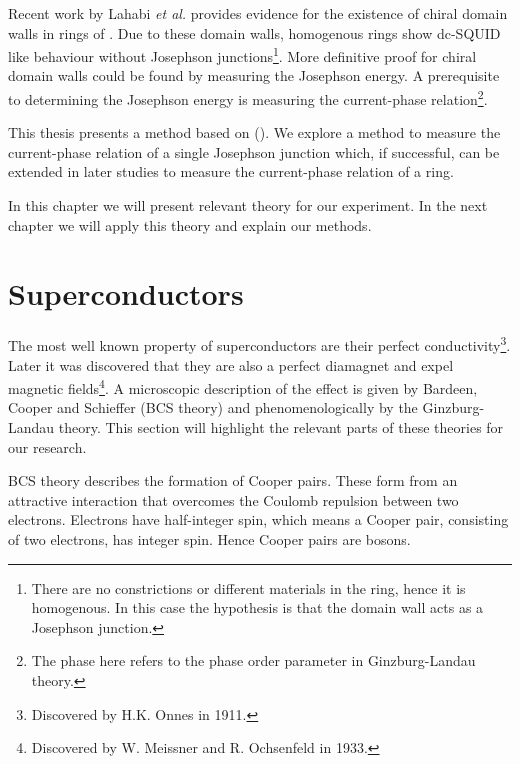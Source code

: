 Recent work by Lahabi \textit{et al.} provides evidence for the existence of chiral domain walls in rings of \cite{lahabiSpintripletSupercurrentsOdd2018}. Due to these domain walls, homogenous  rings show dc-SQUID like behaviour without Josephson junctions\footnote{There are no constrictions or different materials in the ring, hence it is homogenous. In this case the hypothesis is that the domain wall acts as a Josephson junction.}. More definitive proof for chiral domain walls could be found by measuring the Josephson energy. A prerequisite to determining the Josephson energy is measuring the current-phase relation\footnote{The phase here refers to the phase order parameter in Ginzburg-Landau theory.}.

This thesis presents a method based on \citeauthor{frolovMeasurementCurrentPhaseRelation2004} (\citeyear{frolovMeasurementCurrentPhaseRelation2004}). We explore a method to measure the current-phase relation of a single Josephson junction which, if successful, can be extended in later studies to measure the current-phase relation of a  ring.

In this chapter we will present relevant theory for our experiment. In the next chapter we will apply this theory and explain our methods.

\section{Superconductors}
The most well known property of superconductors are their perfect conductivity\footnote{Discovered by H.K. Onnes in 1911.}. Later it was discovered that they are also a perfect diamagnet and expel magnetic fields\footnote{Discovered by W. Meissner and R. Ochsenfeld in 1933.}. A microscopic description of the effect is given by Bardeen, Cooper and Schieffer (BCS theory) and phenomenologically by the Ginzburg-Landau theory\cite{tinkhamIntroductionSuperconductivity}. This section will highlight the relevant parts of these theories for our research.

BCS theory describes the formation of Cooper pairs. These form from an attractive interaction that overcomes the Coulomb repulsion between two electrons\cite{bardeenTheorySuperconductivity1957}. Electrons have half-integer spin, which means a Cooper pair, consisting of two electrons, has integer spin. Hence Cooper pairs are bosons.

